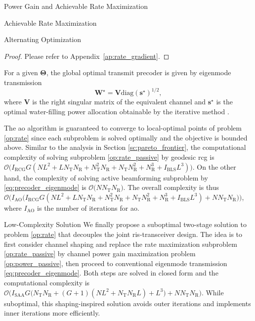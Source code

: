 \documentclass[journal]{IEEEtran}
\begin{document}
\begin{section}{Power Gain and Achievable Rate Maximization}
\begin{subsection}{Achievable Rate Maximization}
\begin{subsubsection}{Alternating Optimization}
			\begin{proof}
				Please refer to Appendix~\ref{ap:rate_gradient}.
			\end{proof}
			For a given $\mathbf{\Theta}$, the global optimal transmit precoder is given by eigenmode transmission \cite{Clerckx2013}
			\begin{equation}
				\mathbf{W}^\star = \mathbf{V} {\mathrm{diag}(\mathbf{s}^\star)}^{1/2},
				\label{eq:precoder_eigenmode}
			\end{equation}
			where $\mathbf{V}$ is the right singular matrix of the equivalent channel and $\mathbf{s}^\star$ is the optimal water-filling power allocation obtainable by the iterative method \cite{Tse2005}.

			The \gls{ao} algorithm is guaranteed to converge to local-optimal points of problem \eqref{op:rate} since each subproblem is solved optimally and the objective is bounded above.
			Similar to the analysis in Section \ref{sc:pareto_frontier}, the computational complexity of solving subproblem \eqref{op:rate_passive} by geodesic \gls{rcg} is $\mathcal{O}\bigl(I_\text{RCG} G (NL^2 + L N_\mathrm{T} N_\mathrm{R} + N_\mathrm{T}^2 N_\mathrm{R} + N_\mathrm{T} N_\mathrm{R}^2 + N_\mathrm{R}^3 + I_\text{BLS} L^3)\bigr)$.
			On the other hand, the complexity of solving active beamforming subproblem by \eqref{eq:precoder_eigenmode} is $\mathcal{O}\bigl(N N_\mathrm{T} N_\mathrm{R}\bigr)$.
			The overall complexity is thus $\mathcal{O}\bigl(I_\text{AO}\bigl(I_\text{RCG} G (NL^2 + L N_\mathrm{T} N_\mathrm{R} + N_\mathrm{T}^2 N_\mathrm{R} + N_\mathrm{T} N_\mathrm{R}^2 + N_\mathrm{R}^3 + I_\text{BLS} L^3) + N N_\mathrm{T} N_\mathrm{R}\bigr)\bigr)$, where $I_\text{AO}$ is the number of iterations for \gls{ao}.
		\end{subsubsection}

		\begin{subsubsection}{Low-Complexity Solution}\label{sc:low_complexity}
			We finally propose a suboptimal two-stage solution to problem \eqref{op:rate} that decouples the joint \gls{ris}-transceiver design.
			The idea is to first consider channel shaping and replace the rate maximization subproblem \eqref{op:rate_passive} by channel power gain maximization problem \eqref{op:power_passive}, then proceed to conventional eigenmode transmission \eqref{eq:precoder_eigenmode}.
			Both steps are solved in closed form and the computational complexity is $\mathcal{O}\bigl(I_\text{SAA} G \bigl(N_\mathrm{T} N_\mathrm{R} + (G+1)(NL^2+N_\mathrm{T} N_\mathrm{R} L) + L^3\bigr) + N N_\mathrm{T} N_\mathrm{R}\bigr)$.
			While suboptimal, this shaping-inspired solution avoids outer iterations and implements inner iterations more efficiently.
		\end{subsubsection}
	\end{subsection}
\end{section}
\end{document}
